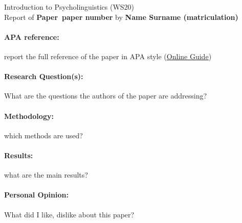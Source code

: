 \documentclass[12pt]{report}
\newcommand{\student}[3]{\begin{tcolorbox}\noindent Introduction to
    Psycholinguistics (WS20) \\ Report of \textbf{Paper~#3} by
    \textbf{#1 (#2)} 
  \end{tcolorbox}}
\begin{document}
\student{Name Surname}{matriculation}{paper number}


\paragraph{APA reference:} report the full reference of the paper in APA style
(\href{https://www.library.kent.edu/files/APACheatSheet.pdf}{\underline{Online Guide}})


\paragraph{Research Question(s):}
What are the questions the authors of the paper are addressing?
\vfill
\paragraph{Methodology:} which methods are used?
\vfill

\paragraph{Results:} what are the main results?
\vfill

\paragraph{Personal Opinion:} What did I like, dislike about this
paper? 
\vfill
\end{document}

